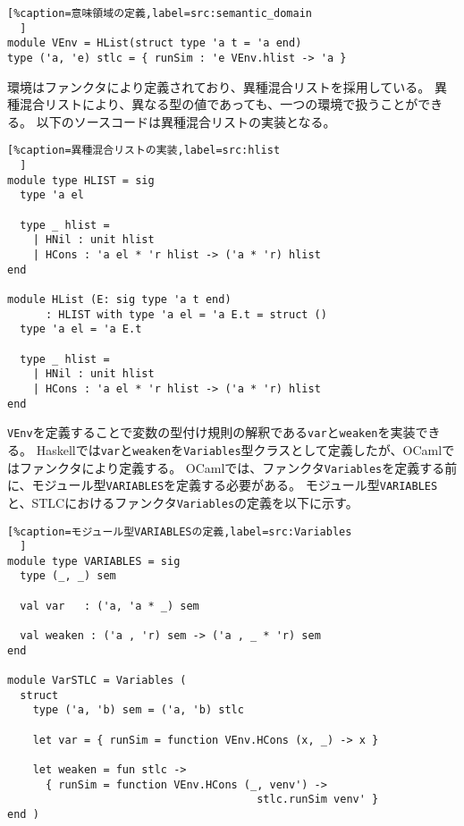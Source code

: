 \documentclass[uplatex]{sumiilab-paper}
\theoremstyle{mystyle}
\numberwithin{definition}{chapter} %
\begin{document}
\begin{lstlisting}[%caption=意味領域の定義,label=src:semantic_domain
  ]
module VEnv = HList(struct type 'a t = 'a end)
type ('a, 'e) stlc = { runSim : 'e VEnv.hlist -> 'a }
\end{lstlisting}

環境はファンクタにより定義されており、異種混合リスト\cite{heterogeneous_oleg}を採用している。
異種混合リストにより、異なる型の値であっても、一つの環境で扱うことができる。
以下のソースコードは異種混合リストの実装となる。

\begin{lstlisting}[%caption=異種混合リストの実装,label=src:hlist
  ]
module type HLIST = sig 
  type 'a el

  type _ hlist = 
    | HNil : unit hlist 
    | HCons : 'a el * 'r hlist -> ('a * 'r) hlist
end 

module HList (E: sig type 'a t end) 
      : HLIST with type 'a el = 'a E.t = struct ()
  type 'a el = 'a E.t 

  type _ hlist = 
    | HNil : unit hlist 
    | HCons : 'a el * 'r hlist -> ('a * 'r) hlist 
end
\end{lstlisting}

{\tt VEnv}を定義することで変数の型付け規則の解釈である{\tt var}と{\tt weaken}を実装できる。
Haskellでは{\tt var}と{\tt weaken}を{\tt Variables}型クラスとして定義したが、OCamlではファンクタにより定義する。
OCamlでは、ファンクタ{\tt Variables}を定義する前に、モジュール型{\tt VARIABLES}を定義する必要がある。
モジュール型{\tt VARIABLES}と、STLCにおけるファンクタ{\tt Variables}の定義を以下に示す。

\begin{lstlisting}[%caption=モジュール型VARIABLESの定義,label=src:Variables
  ]
module type VARIABLES = sig
  type (_, _) sem

  val var   : ('a, 'a * _) sem  

  val weaken : ('a , 'r) sem -> ('a , _ * 'r) sem
end

module VarSTLC = Variables (
  struct 
    type ('a, 'b) sem = ('a, 'b) stlc 

    let var = { runSim = function VEnv.HCons (x, _) -> x }
    
    let weaken = fun stlc -> 
      { runSim = function VEnv.HCons (_, venv') -> 
                                       stlc.runSim venv' }
end )
\end{lstlisting}
\end{document}
